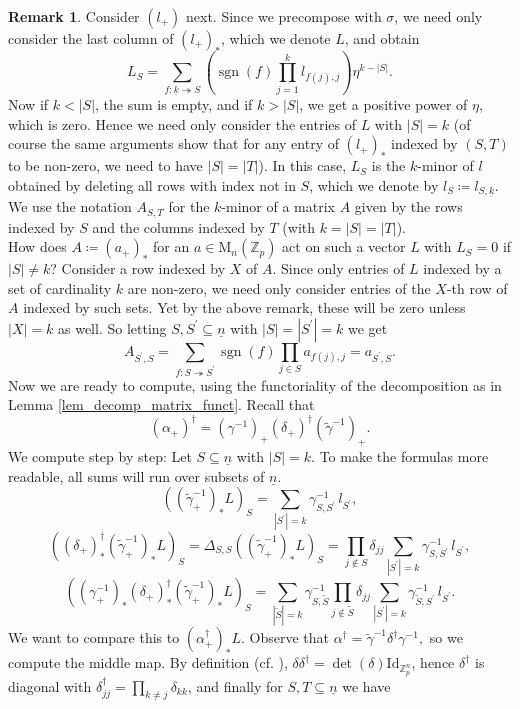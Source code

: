 \documentclass[10pt, a4paper, UKenglish]{article}
\numberwithin{equation}{section}
\newcommand{\bZ}{\mathbb{Z}}
\newcommand{\defas}{\coloneqq}  %
\newcommand{\abs}[1]{\left\vert#1\right\vert}	%
\newcommand{\ind}[1]{\underline{#1}}
\newcommand{\onto}{\twoheadrightarrow}
\newcommand{\sgn}{\operatorname{sgn}}
\newcommand{\M}{\mathrm{M}}
\newcommand{\Id}{\mathrm{Id}}
\theoremstyle{plain}
\theoremstyle{definition}
\newtheorem{rem}[equation]{Remark}
\begin{document}
\begin{rem}
Consider $(l_+)$ next. Since we precompose with $\sigma$, we need only consider the last column of $(l_+)_*$, which we denote $L$, and obtain
\[L_S = \sum_{f:\ind{k} \onto S} (\sgn(f) \prod_{j=1}^k l_{f(j),j}) \eta^{k - \abs{S}}.\]
Now if $k < \abs{S}$, the sum is empty, and if $k > \abs{S}$, we get a positive power of $\eta$, which is zero. Hence we need only consider the entries of $L$ with $\abs{S} = k$ (of course the same arguments show that for any entry of $(l_+)_*$ indexed by $(S,T)$ to be non-zero, we need to have $\abs{S} = \abs{T}$). In this case, $L_S$ is the $k$-minor of $l$ obtained by deleting all rows with index not in $S$, which we denote by $l_S \defas l_{S,\ind{k}}$. We use the notation $A_{S,T}$ for the $k$-minor of a matrix $A$ given by the rows indexed by $S$ and the columns indexed by $T$ (with $k=\abs{S}=\abs{T}$).\\
How does $A \defas (a_+)_*$ for an $a \in \M_n(\bZ_p)$ act on such a vector $L$ with $L_S = 0$ if $\abs{S} \neq k$? Consider a row indexed by $X$ of $A$. Since only entries of $L$ indexed by a set of cardinality $k$ are non-zero, we need only consider entries of the $X$-th row of $A$ indexed by such sets. Yet by the above remark, these will be zero unless $\abs{X} = k$ as well. So letting $S, S^\prime \subseteq \ind{n}$ with $\abs{S} = \abs{S^\prime} = k$ we get
$$A_{S^\prime,S} = \sum_{f:S \onto S^\prime} \sgn(f) \prod_{j \in S}a_{f(j),j} = a_{S^\prime, S}.$$
Now we are ready to compute, using the functoriality of the decomposition as in Lemma \ref{lem_decomp_matrix_funct}.
Recall that $$(\alpha_+)^\dagger = (\gamma^{-1})_+ (\delta_+)^\dagger (\tilde\gamma^{-1})_+.$$ We compute step by step: Let $S \subseteq \ind{n}$ with $\abs{S} = k$. To make the formulas more readable, all sums will run over subsets of $\ind{n}$.
$$ ( (\tilde\gamma_+^{-1})_* L )_S = \sum_{\abs{S^\prime} = k } %
		\gamma^{-1}_{S,S^\prime} \, l_{S^\prime},$$
$$ ( (\delta_+)^\dagger_* (\tilde\gamma_+^{-1})_* L )_S = \Delta_{S,S} ( (\tilde\gamma_+^{-1})_* L )_S =%
		\prod_{j \notin S} \delta_{jj} \sum_{ \abs{S^\prime} = k } \gamma^{-1}_{S,S^\prime}\, l_{S^\prime},$$
$$ ( (\gamma_+^{-1})_* (\delta_+)^\dagger_* (\tilde\gamma_+^{-1})_* L )_S = %
		\sum_{\abs{\tilde S} = k} \gamma^{-1}_{S,\tilde S} \prod_{j \notin \tilde S} \delta_{jj} \sum_{ \abs{S^\prime} = k } \gamma^{-1}_{\tilde S,S^\prime}\, l_{S^\prime}.$$
We want to compare this to $( \alpha^\dagger_+ )_* L$. Observe that
$ \alpha^\dagger = \tilde \gamma^{-1} \delta^\dagger \gamma^{-1},$ %
so we compute the middle map. By definition (cf. \cite[Definition 3.7]{carlsson2011higher}), $\delta \delta^\dagger = \det(\delta) \Id_{\bZ_p^n}$, hence $\delta^\dagger$ is diagonal with $\delta^\dagger_{jj} = \prod_{k \neq j} \delta_{kk}$, and finally for $S,T \subseteq \ind{n}$ we have%

\end{rem}
\end{document}
